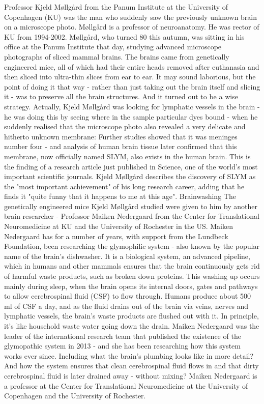 Professor Kjeld Møllgård from the Panum Institute at the University of Copenhagen (KU) was the man who suddenly saw the previously unknown brain on a microscope photo. Møllgård is a professor of neuroanatomy. He was rector of KU from 1994-2002. 
Møllgård, who turned 80 this autumn, was sitting in his office at the Panum Institute that day, studying advanced microscope photographs of sliced mammal brains.
The brains came from genetically engineered mice, all of which had their entire heads removed after euthanasia and then sliced into ultra-thin slices from ear to ear. It may sound laborious, but the point of doing it that way - rather than just taking out the brain itself and slicing it - was to preserve all the brain structures. And it turned out to be a wise strategy.
Actually, Kjeld Møllgård was looking for lymphatic vessels in the brain - he was doing this by seeing where in the sample particular dyes bound - when he suddenly realised that the microscope photo also revealed a very delicate and hitherto unknown membrane:
Further studies showed that it was meninges number four - and analysis of human brain tissue later confirmed that this membrane, now officially named SLYM, also exists in the human brain.
This is the finding of a research article just published in Science, one of the world's most important scientific journals.
Kjeld Møllgård describes the discovery of SLYM as the "most important achievement" of his long research career, adding that he finds it "quite funny that it happens to me at this age".
Brainwashing
The genetically engineered mice Kjeld Møllgård studied were given to him by another brain researcher - Professor Maiken Nedergaard from the Center for Translational Neuromedicine at KU and the University of Rochester in the US.
Maiken Nedergaard has for a number of years, with support from the Lundbeck Foundation, been researching the glymophilic system - also known by the popular name of the brain's dishwasher. It is a biological system, an advanced pipeline, which in humans and other mammals ensures that the brain continuously gets rid of harmful waste products, such as broken down proteins.
This washing up occurs mainly during sleep, when the brain opens its internal doors, gates and pathways to allow cerebrospinal fluid (CSF) to flow through. Humans produce about 500 ml of CSF a day, and as the fluid drains out of the brain via veins, nerves and lymphatic vessels, the brain's waste products are flushed out with it. In principle, it's like household waste water going down the drain.
Maiken Nedergaard was the leader of the international research team that published the existence of the glymopathic system in 2013 - and she has been researching how this system works ever since. Including what the brain's plumbing looks like in more detail? And how the system ensures that clean cerebrospinal fluid flows in and that dirty cerebrospinal fluid is later drained away - without mixing?
Maiken Nedergaard is a professor at the Center for Translational Neuromedicine at the University of Copenhagen and the University of Rochester.


